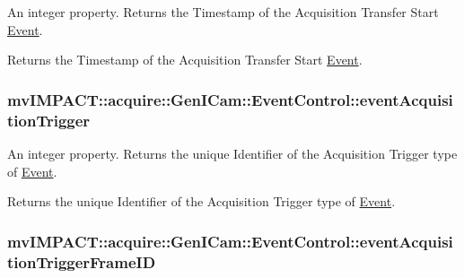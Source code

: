 An integer property. Returns the Timestamp of the Acquisition Transfer Start \hyperlink{classmv_i_m_p_a_c_t_1_1acquire_1_1_event}{Event}. 

Returns the Timestamp of the Acquisition Transfer Start \hyperlink{classmv_i_m_p_a_c_t_1_1acquire_1_1_event}{Event}. \hypertarget{classmv_i_m_p_a_c_t_1_1acquire_1_1_gen_i_cam_1_1_event_control_ae8d212f2295c76df79d0d83b08382520}{
\subsubsection[{event\+Acquisition\+Trigger}]{ mv\+I\+M\+P\+A\+C\+T\+::acquire\+::\+Gen\+I\+Cam\+::\+Event\+Control\+::event\+Acquisition\+Trigger}}\label{classmv_i_m_p_a_c_t_1_1acquire_1_1_gen_i_cam_1_1_event_control_ae8d212f2295c76df79d0d83b08382520}


An integer property. Returns the unique Identifier of the Acquisition Trigger type of \hyperlink{classmv_i_m_p_a_c_t_1_1acquire_1_1_event}{Event}. 

Returns the unique Identifier of the Acquisition Trigger type of \hyperlink{classmv_i_m_p_a_c_t_1_1acquire_1_1_event}{Event}. \hypertarget{classmv_i_m_p_a_c_t_1_1acquire_1_1_gen_i_cam_1_1_event_control_ac15fd6737465a020f94c8177638757a3}{
\subsubsection[{event\+Acquisition\+Trigger\+Frame\+I\+D}]{ mv\+I\+M\+P\+A\+C\+T\+::acquire\+::\+Gen\+I\+Cam\+::\+Event\+Control\+::event\+Acquisition\+Trigger\+Frame\+I\+D}}\label{classmv_i_m_p_a_c_t_1_1acquire_1_1_gen_i_cam_1_1_event_control_ac15fd6737465a020f94c8177638757a3}



